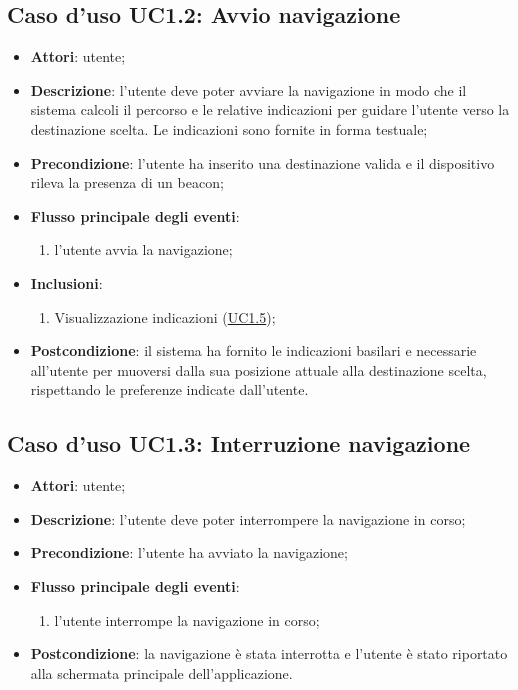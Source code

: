\documentclass[../AnalisiDeiRequisiti.tex]{subfiles}
\begin{document}
\subsection{Caso d'uso UC1.2: Avvio navigazione}
\begin{itemize}
\item \textbf{Attori}: utente;
\item \textbf{Descrizione}: l'utente deve poter avviare la navigazione in modo che il sistema calcoli il percorso e le relative indicazioni per guidare l'utente verso la destinazione scelta. Le indicazioni sono fornite in forma testuale; 
      \item \textbf{Precondizione}: l'utente ha inserito una destinazione valida e il dispositivo rileva la presenza di un beacon;

        \item \textbf{Flusso principale degli eventi}:
          \begin{enumerate}
          \item l'utente avvia la navigazione;

      \end{enumerate}
    \item \textbf{Inclusioni}:
      \begin{enumerate}
          \item Visualizzazione indicazioni (\hyperlink{UC1.5}{UC1.5});

      \end{enumerate}
    \item \textbf{Postcondizione}: il sistema ha fornito le indicazioni basilari  e necessarie all'utente per muoversi dalla sua posizione attuale alla destinazione scelta, rispettando le preferenze indicate dall'utente.
  \end{itemize}
\hypertarget{UC1.3}{}
\subsection{Caso d'uso UC1.3: Interruzione navigazione}
\begin{itemize}
\item \textbf{Attori}: utente;
\item \textbf{Descrizione}: l'utente deve poter interrompere la navigazione in corso; 
      \item \textbf{Precondizione}: l'utente ha avviato la navigazione;

        \item \textbf{Flusso principale degli eventi}:
          \begin{enumerate}
          \item l'utente interrompe la navigazione in corso;

      \end{enumerate}
    \item \textbf{Postcondizione}: la navigazione è stata interrotta e l'utente è stato riportato alla schermata principale dell'applicazione.
  \end{itemize}
\hypertarget{UC1.4}{}
\end{document}
